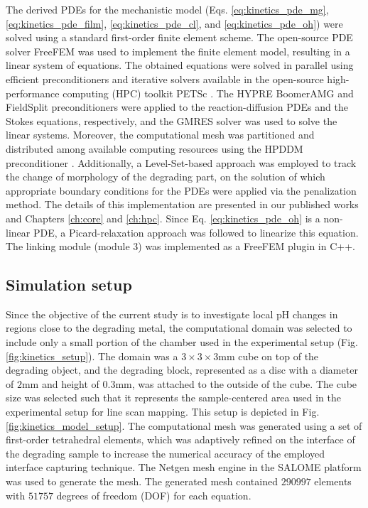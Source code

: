 The derived \gls{PDE}s for the mechanistic model (Eqs. \ref{eq:kinetics_pde_mg}, \ref{eq:kinetics_pde_film}, \ref{eq:kinetics_pde_cl}, and \ref{eq:kinetics_pde_oh}) were solved using a standard first-order finite element scheme. The open-source \gls{PDE} solver FreeFEM \cite{Hecht2012} was used to implement the finite element model, resulting in a linear system of equations. The obtained equations were solved in parallel using efficient preconditioners and iterative solvers available in the open-source high-performance computing (\gls{HPC}) toolkit \gls{PETSc} \cite{petsc}. The HYPRE BoomerAMG \cite{Falgout2002} and FieldSplit preconditioners were applied to the reaction-diffusion \gls{PDE}s and the Stokes equations, respectively, and the \gls{GMRES} solver \cite{Saad1986} was used to solve the linear systems. Moreover, the computational mesh was partitioned and distributed among available computing resources using the \gls{HPDDM} preconditioner \cite{Jolivet2013}. Additionally, a Level-Set-based approach was employed to track the change of morphology of the degrading part, on the solution of which appropriate boundary conditions for the \gls{PDE}s were applied via the penalization method. The details of this implementation are presented in our published works \cite{Barzegari2021, Barzegari2022} and Chapters \ref{ch:core} and \ref{ch:hpc}. Since Eq. \ref{eq:kinetics_pde_oh} is a non-linear \gls{PDE}, a Picard-relaxation approach was followed to linearize this equation. The linking module (module 3) was implemented as a FreeFEM plugin in C++.

\subsection{Simulation setup}

Since the objective of the current study is to investigate local pH changes in regions close to the degrading metal, the computational domain was selected to include only a small portion of the chamber used in the experimental setup (Fig. \ref{fig:kinetics_setup}). The domain was a $3\times3\times3\text{mm}$ cube on top of the degrading object, and the degrading block, represented as a disc with a diameter of $2 \text{mm}$ and height of $0.3 \text{mm}$, was attached to the outside of the cube. The cube size was selected such that it represents the sample-centered area used in the experimental setup for line scan mapping. This setup is depicted in Fig. \ref{fig:kinetics_model_setup}. The computational mesh was generated using a set of first-order tetrahedral elements, which was adaptively refined on the interface of the degrading sample to increase the numerical accuracy of the employed interface capturing technique. The Netgen mesh engine \cite{Schoeberl1997} in the SALOME platform \cite{Ribes2007} was used to generate the mesh. The generated mesh contained $\num{290997}$ elements with $\num{51757}$ degrees of freedom (\gls{DOF}) for each equation.


